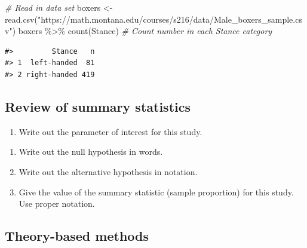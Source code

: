 \documentclass[
]{report}
\newenvironment{Shaded}{\begin{snugshade}}{\end{snugshade}}
\newcommand{\CommentTok}[1]{\textcolor[rgb]{0.56,0.35,0.01}{\textit{#1}}}
\newcommand{\FunctionTok}[1]{\textcolor[rgb]{0.00,0.00,0.00}{#1}}
\newcommand{\NormalTok}[1]{#1}
\newcommand{\OtherTok}[1]{\textcolor[rgb]{0.56,0.35,0.01}{#1}}
\newcommand{\SpecialCharTok}[1]{\textcolor[rgb]{0.00,0.00,0.00}{#1}}
\newcommand{\StringTok}[1]{\textcolor[rgb]{0.31,0.60,0.02}{#1}}
\providecommand{\tightlist}{%
  \setlength{\itemsep}{0pt}\setlength{\parskip}{0pt}}
\begin{document}
\begin{Shaded}
\begin{Highlighting}[]
 \CommentTok{\# Read in data set}
\NormalTok{boxers }\OtherTok{\textless{}{-}} \FunctionTok{read.csv}\NormalTok{(}\StringTok{"https://math.montana.edu/courses/s216/data/Male\_boxers\_sample.csv"}\NormalTok{)}
\NormalTok{boxers }\SpecialCharTok{\%\textgreater{}\%} \FunctionTok{count}\NormalTok{(Stance)  }\CommentTok{\# Count number in each Stance category}
\end{Highlighting}
\end{Shaded}

\begin{verbatim}
#>         Stance   n
#> 1  left-handed  81
#> 2 right-handed 419
\end{verbatim}

\hypertarget{review-of-summary-statistics}{%
\subsection*{Review of summary statistics}\label{review-of-summary-statistics}}

\begin{enumerate}
\def\labelenumi{\arabic{enumi}.}
\tightlist
\item
  Write out the parameter of interest for this study.
\end{enumerate}

\vspace{0.8in}

\begin{enumerate}
\def\labelenumi{\arabic{enumi}.}
\setcounter{enumi}{1}
\item
  Write out the null hypothesis in words.
  \vspace{0.8in}
\item
  Write out the alternative hypothesis in notation.
  \vspace{0.3in}
\item
  Give the value of the summary statistic (sample proportion) for this study. Use proper notation.
\end{enumerate}

\vspace{0.3in}

\hypertarget{theory-based-methods}{%
\subsection*{Theory-based methods}\label{theory-based-methods}}
\end{document}
